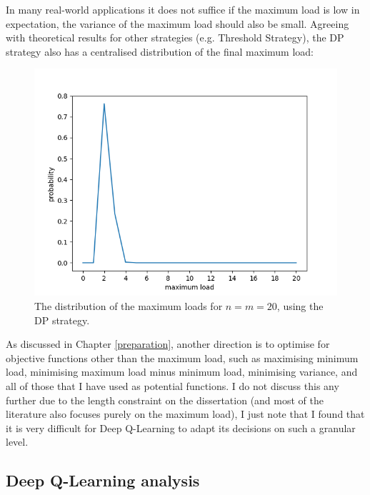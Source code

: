 In many real-world applications it does not suffice if the maximum load is low in expectation, the variance of the maximum load should also be small. Agreeing with theoretical results for other strategies (e.g. Threshold Strategy), the DP strategy also has a centralised distribution of the final maximum load:


\begin{figure}[hbt!] \label{two-thinning-maxload-distribution}
    \centering
    \includegraphics[scale=1.0]{Chapter4/Figs/max_load_distribution_20_20.png}
    \caption{The distribution of the maximum loads for $n=m=20$, using the DP strategy.}
\end{figure}


As discussed in Chapter \ref{preparation}, another direction is to optimise for objective functions other than the maximum load, such as maximising minimum load, minimising maximum load minus minimum load, minimising variance, and all of those that I have used as potential functions. I do not discuss this any further due to the length constraint on the dissertation (and most of the literature also focuses purely on the maximum load), I just note that I found that it is very difficult for Deep Q-Learning to adapt its decisions on such a granular level. 


\subsection{Deep Q-Learning analysis}







